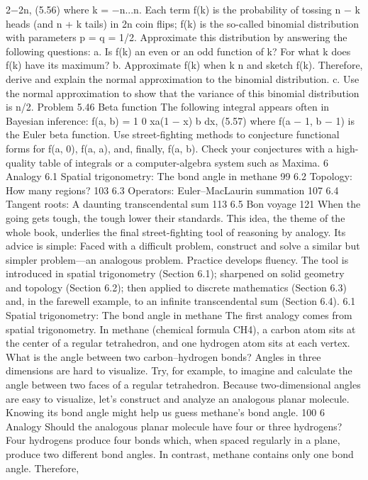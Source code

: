 \documentclass[a4paper]{article}
\begin{document}
2−2n, (5.56)
where k = −n...n. Each term f(k) is the probability of tossing n − k heads
(and n + k tails) in 2n coin flips; f(k) is the so-called binomial distribution
with parameters p = q = 1/2. Approximate this distribution by answering the
following questions:
a. Is f(k) an even or an odd function of k? For what k does f(k) have its
maximum?
b. Approximate f(k) when k  n and sketch f(k). Therefore, derive and explain
the normal approximation to the binomial distribution.
c. Use the normal approximation to show that the variance of this binomial
distribution is n/2.
Problem 5.46 Beta function
The following integral appears often in Bayesian inference:
f(a, b) = 1
0
xa(1 − x)
b dx, (5.57)
where f(a − 1, b − 1) is the Euler beta function. Use street-fighting methods to
conjecture functional forms for f(a, 0), f(a, a), and, finally, f(a, b). Check your
conjectures with a high-quality table of integrals or a computer-algebra system
such as Maxima.
6
Analogy
6.1 Spatial trigonometry: The bond angle in methane 99
6.2 Topology: How many regions? 103
6.3 Operators: Euler–MacLaurin summation 107
6.4 Tangent roots: A daunting transcendental sum 113
6.5 Bon voyage 121
When the going gets tough, the tough lower their standards. This idea,
the theme of the whole book, underlies the final street-fighting tool of
reasoning by analogy. Its advice is simple: Faced with a difficult problem,
construct and solve a similar but simpler problem—an analogous problem.
Practice develops fluency. The tool is introduced in spatial trigonometry
(Section 6.1); sharpened on solid geometry and topology (Section 6.2);
then applied to discrete mathematics (Section 6.3) and, in the farewell
example, to an infinite transcendental sum (Section 6.4).
6.1 Spatial trigonometry: The bond angle in methane
The first analogy comes from spatial trigonometry. In
methane (chemical formula CH4), a carbon atom sits at
the center of a regular tetrahedron, and one hydrogen
atom sits at each vertex. What is the angle between
two carbon–hydrogen bonds?
Angles in three dimensions are hard to visualize. Try, for
example, to imagine and calculate the angle between two faces of a regular
tetrahedron. Because two-dimensional angles are easy to visualize, let’s
construct and analyze an analogous planar molecule. Knowing its bond
angle might help us guess methane’s bond angle.
100 6 Analogy
Should the analogous planar molecule have four or three hydrogens?
Four hydrogens produce four bonds which, when spaced
regularly in a plane, produce two different bond angles. In
contrast, methane contains only one bond angle. Therefore,
\end{document}
